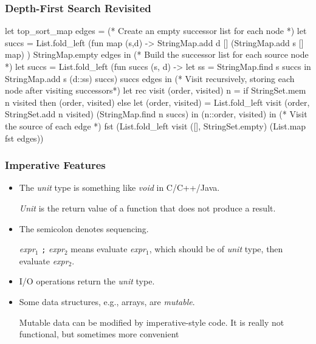 \documentclass{plt}
\begin{document}


\begin{frame}[fragile]
  \frametitle{Depth-First Search Revisited}


\begin{ocaml}
let top_sort_map edges =
  (* Create an empty successor list for each node *)
  let succs = List.fold_left
      (fun map (s,d) ->
        StringMap.add d [] (StringMap.add s [] map)
      ) StringMap.empty edges
  in (* Build the successor list for each source node *)
  let succs = List.fold_left
      (fun succs (s, d) ->
        let ss = StringMap.find s succs
        in StringMap.add s (d::ss) succs) succs edges
  in 
  (* Visit recursively, storing each node after visiting successors*)
  let rec visit (order, visited) n =
    if StringSet.mem n visited then
      (order, visited)
    else  let (order, visited) = List.fold_left
              visit (order, StringSet.add n visited)
              (StringMap.find n succs)
          in (n::order, visited)
  in (* Visit the source of each edge *)
  fst (List.fold_left visit ([], StringSet.empty) 
                            (List.map fst edges))
\end{ocaml}

\end{frame}

\begin{frame}[fragile]
  \frametitle{Imperative Features}

\begin{itemize}

\item The \emph{unit} type is something like \emph{void} in C/C++/Java.

\emph{Unit} is the return value of a function that does not produce a result.

\item The semicolon denotes sequencing.

\emph{expr}$_1$ \texttt{;}
  \emph{expr}$_2$ means evaluate \emph{expr}$_1$, which should be of
  \emph{unit} type, then evaluate \emph{expr}$_2$.

\item I/O operations return the \emph{unit} type.

\item Some data structures, e.g., arrays, are \emph{mutable}.

Mutable data can be modified by imperative-style code.  It is really
not functional, but sometimes more convenient
\end{itemize}

\end{frame}
\end{document}
